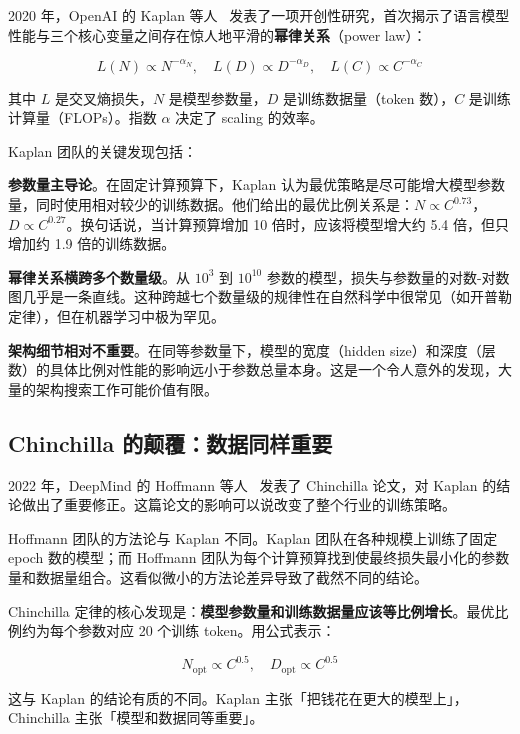 2020 年，OpenAI 的 Kaplan 等人~\cite{kaplan2020scaling} 发表了一项开创性研究，首次揭示了语言模型性能与三个核心变量之间存在惊人地平滑的\textbf{幂律关系}（power law）：

\begin{equation}
  L(N) \propto N^{-\alpha_N}, \quad L(D) \propto D^{-\alpha_D}, \quad L(C) \propto C^{-\alpha_C}
\end{equation}

其中 $L$ 是交叉熵损失，$N$ 是模型参数量，$D$ 是训练数据量（token 数），$C$ 是训练计算量（FLOPs）。指数 $\alpha$ 决定了 scaling 的效率。

Kaplan 团队的关键发现包括：

\textbf{参数量主导论}。在固定计算预算下，Kaplan 认为最优策略是尽可能增大模型参数量，同时使用相对较少的训练数据。他们给出的最优比例关系是：$N \propto C^{0.73}$，$D \propto C^{0.27}$。换句话说，当计算预算增加 10 倍时，应该将模型增大约 5.4 倍，但只增加约 1.9 倍的训练数据。

\textbf{幂律关系横跨多个数量级}。从 $10^3$ 到 $10^{10}$ 参数的模型，损失与参数量的对数-对数图几乎是一条直线。这种跨越七个数量级的规律性在自然科学中很常见（如开普勒定律），但在机器学习中极为罕见。

\textbf{架构细节相对不重要}。在同等参数量下，模型的宽度（hidden size）和深度（层数）的具体比例对性能的影响远小于参数总量本身。这是一个令人意外的发现，大量的架构搜索工作可能价值有限。

\subsection{Chinchilla 的颠覆：数据同样重要}

2022 年，DeepMind 的 Hoffmann 等人~\cite{hoffmann2022chinchilla} 发表了 Chinchilla 论文，对 Kaplan 的结论做出了重要修正。这篇论文的影响可以说改变了整个行业的训练策略。

Hoffmann 团队的方法论与 Kaplan 不同。Kaplan 团队在各种规模上训练了固定 epoch 数的模型；而 Hoffmann 团队为每个计算预算找到使最终损失最小化的参数量和数据量组合。这看似微小的方法论差异导致了截然不同的结论。

Chinchilla 定律的核心发现是：\textbf{模型参数量和训练数据量应该等比例增长}。最优比例约为每个参数对应 20 个训练 token。用公式表示：

\begin{equation}
  N_{\text{opt}} \propto C^{0.5}, \quad D_{\text{opt}} \propto C^{0.5}
\end{equation}

这与 Kaplan 的结论有质的不同。Kaplan 主张「把钱花在更大的模型上」，Chinchilla 主张「模型和数据同等重要」。

